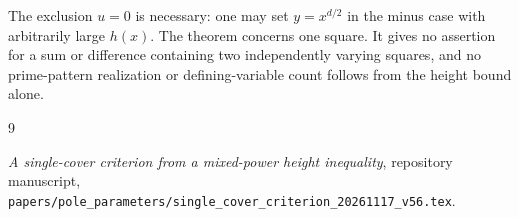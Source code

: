 \documentclass[11pt,a4paper]{article}
\begin{document}
The exclusion $u=0$ is necessary: one may set
$y=x^{d/2}$ in the minus case with arbitrarily large $h(x)$.
The theorem concerns one square. It gives no assertion for a sum or
difference containing two independently varying squares, and no
prime-pattern realization or defining-variable count follows from
the height bound alone.

\begin{thebibliography}{9}\raggedright
{}\emph{A single-cover criterion from a mixed-power height
inequality}, repository manuscript,
\nolinkurl{papers/pole_parameters/single_cover_criterion_20261117_v56.tex}.
\end{thebibliography}
\end{document}
